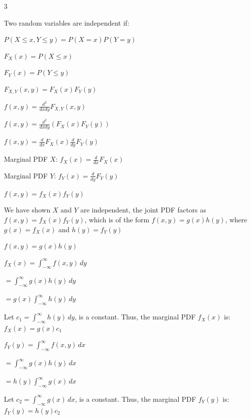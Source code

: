\documentclass[12 pt]{article}
\begin{document}
    \begin{exercise}{3}
    \hfill

    Two random variables are independent if:

    $P(X \leq x, Y \leq y) = P(X=x)P(Y=y)$

    \hfill

    $F_X(x) = P(X \leq x)$

    $F_Y(x) = P(Y \leq y)$

    \hfill

    $F_{X,Y}(x,y) = F_X(x) F_Y(y)$

    \hfill

    $f(x,y) = \frac{d^2}{dxdy}F_{X,Y}(x,y)$

    $f(x,y) = \frac{d^2}{dxdy}(F_X(x) F_Y(y))$

    $f(x,y) = \frac{d}{dx}F_X(x) \frac{d}{dy}F_Y(y)$

    \hfill

    Marginal PDF $X$: $f_X(x) = \frac{d}{dx} F_X(x)$

    Marginal PDF $Y$: $f_Y(x) = \frac{d}{dy} F_Y(y)$

    \hfill

    $f(x,y) = f_X(x) f_Y(y)$

    \hfill

    We have shown $X$ and $Y$ are independent, the joint PDF factors as $f(x,y) = f_X(x) f_Y(y)$, which is of the form $f(x,y) = g(x)h(y)$, where $g(x) = f_X(x)$ and $h(y) = f_Y(y)$

    \hfill

    $f(x,y) = g(x)h(y)$

    \hfill

    $f_X(x) = \int_{-\infty}^{\infty} f(x,y) \, dy$

    $= \int_{-\infty}^{\infty} g(x)h(y) \, dy$

    $= g(x) \int_{-\infty}^{\infty} h(y) \, dy$

    Let $c_1 = \int_{-\infty}^{\infty} h(y) \, dy$, is a constant. Thus, the marginal PDF $f_X(x)$ is: $f_X(x) = g(x) c_1$

    \hfill

    $f_Y(y) = \int_{-\infty}^{\infty} f(x,y) \, dx$

    $= \int_{-\infty}^{\infty} g(x) h(y) \, dx$

    $= h(y) \int_{-\infty}^{\infty} g(x) \, dx$

    Let $c_2 = \int_{-\infty}^{\infty} g(x) \, dx$, is a constant. Thus, the marginal PDF $f_Y(y)$ is: $f_Y(y) = h(y) c_2$


\end{exercise}
\end{document}
